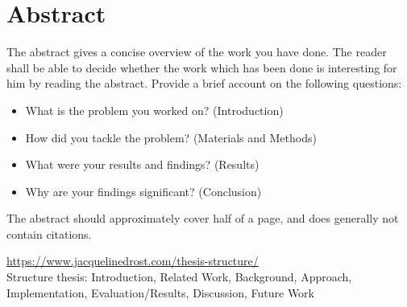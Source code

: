 \markleft{\abstractname}

\chapter*{Abstract}
%
The abstract gives a concise overview of the work you have done. The reader shall be able to decide whether the work which has been done is interesting for him by reading the abstract. Provide a brief account on the following questions:

\begin{itemize}
	\item What is the problem you worked on? (Introduction)
	\item How did you tackle the problem? (Materials and Methods)
	\item What were your results and findings? (Results)
	\item Why are your findings significant? (Conclusion)
\end{itemize}

The abstract should approximately cover half of a page, and does generally not contain citations.
 
%
\url{https://www.jacquelinedrost.com/thesis-structure/}\\
Structure thesis: Introduction, Related Work, Background, Approach, Implementation, Evaluation/Results, Discussion, Future Work\\


%
\lipsum[1]

